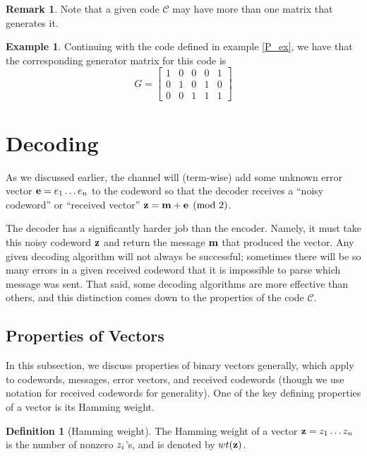 \documentclass[12pt,twoside]{reedthesis}
\theoremstyle{definition}
\newtheorem{definition}[theorem]{Definition}
\newtheorem{example}[theorem]{Example}
\newtheorem{remark}[theorem]{Remark}
\begin{document}
\begin{remark}
Note that a given code $\mathscr{C}$ may have more than one matrix that generates it.
\end{remark}

\begin{example}
Continuing with the code defined in example \ref{P_ex}, we have that the corresponding generator matrix for this code is 
\begin{equation*}
G = 
\left[
\begin{array}{ccc|cc}
1 & 0 & 0 	& 0 & 1	  \\
0 & 1& 0	& 	1 & 0 \\
0 & 0 & 1 	& 1 & 1
\end{array}
\right]
\end{equation*}
\end{example}

\section{Decoding}
As we discussed earlier, the channel will (term-wise) add some unknown error vector $\mathbf{e}=e_{1} \ldots e_{n}$ to the codeword so that the decoder receives a ``noisy codeword'' or ``received vector'' $\mathbf{z} = \mathbf{m} + \mathbf{e} \pmod 2$. 

The decoder has a significantly harder job than the encoder. Namely, it must take this noisy codeword $\mathbf{z}$ and return the message $\mathbf{m}$ that produced the vector. Any given decoding algorithm will not always be successful; sometimes there will be so many errors in a given received codeword that it is impossible to parse which message was sent. That said, some decoding algorithms are more effective than others, and this distinction comes down to the properties of the code $\mathscr{C}$.

\subsection{Properties of Vectors}

In this subsection, we discuss properties of binary vectors generally, which apply to codewords, messages, error vectors, and received codewords (though we use notation for received codewords for generality). One of the key defining properties of a vector is its Hamming weight.
\begin{definition}[Hamming weight] The Hamming weight of a vector $\mathbf{z} = z_{1}  \ldots z_{n}$ is the number of nonzero $z_{i}$'s, and is denoted by $wt(\mathbf{z})$.
\end{definition}
\end{document}
